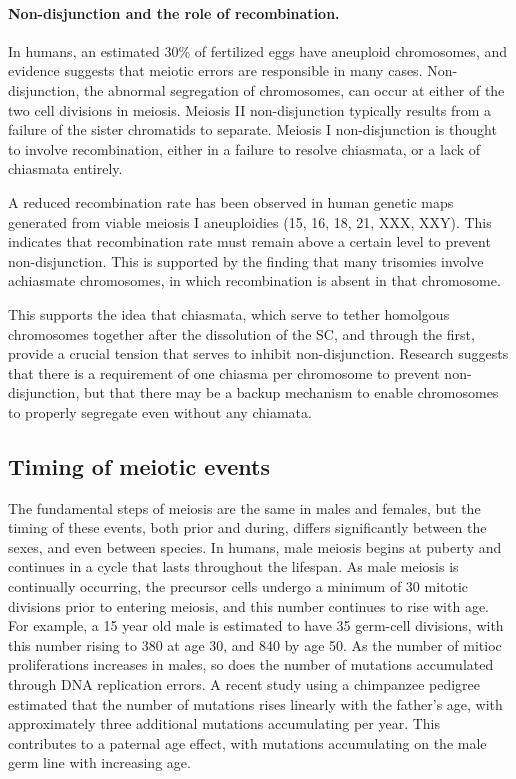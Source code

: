 \paragraph{Non-disjunction and the role of recombination.}
In humans, an estimated 30\% of fertilized eggs have aneuploid chromosomes\cite{Hassold2001}, and evidence suggests that meiotic errors are responsible in many cases.
Non-disjunction, the abnormal segregation of chromosomes, can occur at either of the two cell divisions in meiosis.
Meiosis II non-disjunction typically results from a failure of the sister chromatids to separate.
Meiosis I non-disjunction is thought to involve recombination, either in a failure to resolve chiasmata, or a lack of chiasmata entirely.

A reduced recombination rate has been observed in human genetic maps generated from viable meiosis I aneuploidies (15, 16, 18, 21, XXX, XXY)\cite{Hassold2001,Lynn2004}.
This indicates that recombination rate must remain above a certain level to prevent non-disjunction.
This is supported by the finding that many trisomies involve achiasmate chromosomes, in which recombination is absent in that chromosome\cite{Nagaoka2012}.

This supports the idea that chiasmata, which serve to tether homolgous chromosomes together after the dissolution of the SC, and through the first, provide a crucial tension that serves to inhibit non-disjunction.
Research suggests that there is a requirement of one chiasma per chromosome to prevent non-disjunction, but that there may be a backup mechanism to enable chromosomes to properly segregate even without any chiamata\cite{Fledel-Alon2009}.



\subsection{Timing of meiotic events}

The fundamental steps of meiosis are the same in males and females, but the timing of these events, both prior and during, differs significantly between the sexes\cite{Lynn2004}, and even between species.
In humans, male meiosis begins at puberty and continues in a cycle that lasts throughout the lifespan.
As male meiosis is continually occurring, the precursor cells undergo a minimum of 30 mitotic divisions prior to entering meiosis, and this number continues to rise with age.
For example, a 15 year old male is estimated to have 35 germ-cell divisions, with this number rising to 380 at age 30, and 840 by age 50\cite{Crow2000a}.
As the number of mitioc proliferations increases in males, so does the number of mutations accumulated through DNA replication errors.
A recent study using a chimpanzee pedigree estimated that the number of mutations rises linearly with the father's age, with approximately three additional mutations accumulating per year\cite{Venn2014}.
This contributes to a paternal age effect, with mutations accumulating on the male germ line with increasing age.

